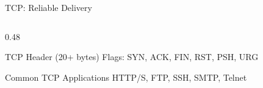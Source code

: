 \documentclass[aspectratio=169, 11pt]{beamer}
\begin{document}
\begin{frame}{TCP: Reliable Delivery}
\begin{columns}[T]
\begin{column}{0.48\textwidth}
\begin{block}{TCP Header (20+ bytes)}
                \vspace{0.3em}
                \scriptsize
                \colorbox{aborange!30}{Flags}: SYN, ACK, FIN, RST, PSH, URG
            \end{block}
            
            \vspace{0.2em}
            \begin{block}{Common TCP Applications}
                \small
                HTTP/S, FTP, SSH, SMTP, Telnet
            \end{block}
        \end{column}
    \end{columns}
\end{frame}

\end{document}
